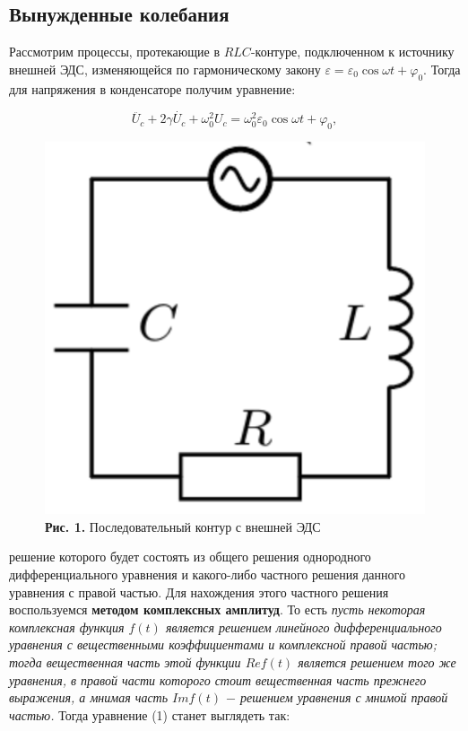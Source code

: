 \documentclass[a4paper,12pt]{article} %
\begin{document}
\subsection{Вынужденные колебания}
\hfill \break Рассмотрим процессы, протекающие в $RLC$-контуре, подключенном к источнику внешней ЭДС, изменяющейся по гармоническому закону $\varepsilon = \varepsilon_{0}\cos{\omega t + \varphi_{0}}$. Тогда для напряжения в конденсаторе получим уравнение:

\begin{equation}\label{ linkname }
\ddot{U_{c}} + 2\gamma \dot{U_{c}} + \omega_{0}^2U_{c} = \omega_{0}^2\varepsilon_{0}\cos{\omega t + \varphi_{0}},
\end{equation}

\begin{figure}
\begin{center}
    \includegraphics[width=1\textwidth]{3.2.1_1.png}
    \textbf{Рис. 1.} Последовательный контур с внешней ЭДС
\end{center}
\end{figure}

\hfill \break решение которого будет состоять из общего решения однородного дифференциального уравнения и какого-либо частного решения данного уравнения с правой частью. Для нахождения этого частного решения воспользуемся \textbf{методом комплексных амплитуд}. То есть \textit{пусть некоторая комплексная функция $f(t)$ является решением линейного дифференциального уравнения с вещественными коэффициентами и комплексной правой частью; тогда вещественная часть этой функции $Re f(t)$ является решением того же уравнения, в правой части которого стоит вещественная часть прежнего выражения, а мнимая часть $Im f(t)$ $-$ решением уравнения с мнимой правой частью.} Тогда уравнение (1) станет выглядеть так:
\end{document}
